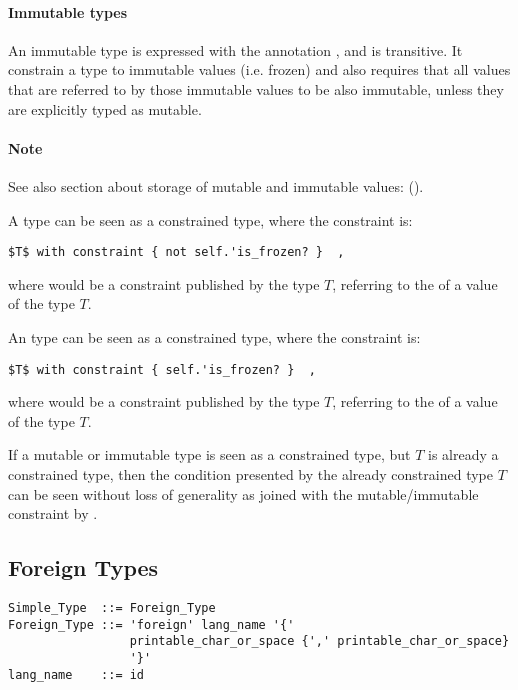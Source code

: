 \paragraph{Immutable types}
An immutable type is expressed with the annotation , and is transitive. It constrain a type to immutable values (i.e. frozen) and also requires that all values that are referred to by those immutable values to be also immutable, unless they are explicitly typed as mutable. 

\paragraph{Note}
See also section about storage of mutable and immutable values: ().

A  type can be seen as a constrained type, where the constraint is:
\begin{lstlisting}
$T$ with constraint { not self.'is_frozen? }  ,
\end{lstlisting}
where  would be a constraint published by the type $T$, referring to the  of a value of the type $T$. 

An  type can be seen as a constrained type, where the constraint is:
\begin{lstlisting}
$T$ with constraint { self.'is_frozen? }  ,
\end{lstlisting}
where  would be a constraint published by the type $T$, referring to the  of a value of the type $T$. 

If a mutable or immutable type is seen as a constrained type, but $T$ is already a constrained type, then the condition presented by the already constrained type $T$ can be seen without loss of generality as joined with the mutable/immutable constraint by . 





\subsection{Foreign Types}
\label{sec:foreign-types}

\syntax\begin{lstlisting}
Simple_Type  ::= Foreign_Type
Foreign_Type ::= 'foreign' lang_name '{' 
                 printable_char_or_space {',' printable_char_or_space}
                 '}'
lang_name    ::= id
\end{lstlisting}

